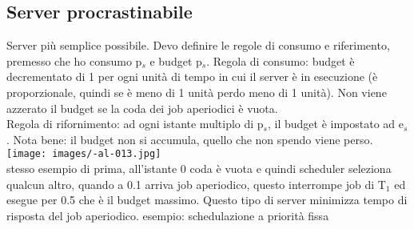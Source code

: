 \documentclass{article}
\begin{document}
\subsection{Server procrastinabile}
Server più semplice possibile. Devo definire le regole di consumo e riferimento, premesso che ho consumo p$_{s}$ e budget p$_{s}$. Regola di consumo: budget è decrementato di 1 per ogni unità di tempo in cui il server è in esecuzione (è proporzionale, quindi se è meno di 1 unità perdo meno di 1 unità). Non viene azzerato il budget se la coda dei job aperiodici è vuota.\\ Regola di rifornimento: ad ogni istante multiplo di p$_{s}$, il budget è impostato ad e$_{s}$. Nota bene: il budget non si accumula, quello che non spendo viene perso.\\
\texttt{[image: images/-al-013.jpg]}\\ 
stesso esempio di prima, all'istante 0 coda è vuota e quindi scheduler seleziona qualcun altro, quando a 0.1 arriva job aperiodico, questo interrompe job di T$_{1}$ ed esegue per 0.5 che è il budget massimo. Questo tipo di server minimizza tempo di risposta del job aperiodico. esempio: schedulazione a priorità fissa\\
\end{document}
